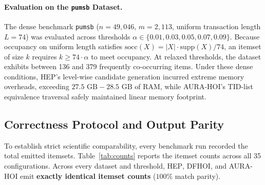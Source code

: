 \documentclass[runningheads,orivec]{llncs}
\newcommand{\AURA}{\textsc{AURA-HOI}}
\newcommand{\HEP}{\textsc{HEP}}
\newcommand{\DFHOI}{\textsc{DFHOI}}
\begin{document}
\paragraph{Evaluation on the \texttt{pumsb} Dataset.}
The dense benchmark \texttt{pumsb} ($n = 49{,}046$, $m = 2{,}113$, uniform transaction length $L = 74$) was evaluated across thresholds $\alpha \in \{0.01, 0.03, 0.05, 0.07, 0.09\}$. Because occupancy on uniform length satisfies $\text{socc}(X) = |X| \cdot \text{supp}(X) / 74$, an itemset of size $k$ requires $k \ge 74 \cdot \alpha$ to meet occupancy. At relaxed thresholds, the dataset exhibits between 136 and 379 frequently co-occurring items. Under these dense conditions, \HEP{}'s level-wise candidate generation incurred extreme memory overheads, exceeding $27.5\text{ GB} - 28.5\text{ GB}$ of RAM, while \AURA's TID-list equivalence traversal safely maintained linear memory footprint.

\subsection{Correctness Protocol and Output Parity}
To establish strict scientific comparability, every benchmark run recorded the total emitted itemsets. Table~\ref{tab:counts} reports the itemset counts across all 35 configurations. Across every dataset and threshold, \HEP, \DFHOI, and \AURA{} emit \textbf{exactly identical itemset counts} ($100\%$ match parity).
\end{document}
